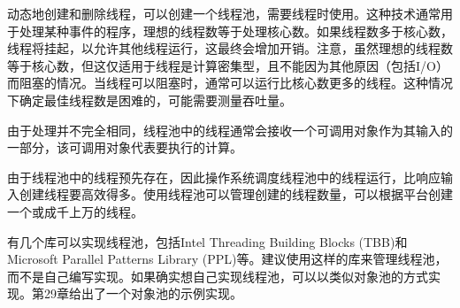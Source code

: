 动态地创建和删除线程，可以创建一个线程池，需要线程时使用。这种技术通常用于处理某种事件的程序，理想的线程数等于处理核心数。如果线程数多于核心数，线程将挂起，以允许其他线程运行，这最终会增加开销。注意，虽然理想的线程数等于核心数，但这仅适用于线程是计算密集型，且不能因为其他原因（包括I/O）而阻塞的情况。当线程可以阻塞时，通常可以运行比核心数更多的线程。这种情况下确定最佳线程数是困难的，可能需要测量吞吐量。

由于处理并不完全相同，线程池中的线程通常会接收一个可调用对象作为其输入的一部分，该可调用对象代表要执行的计算。

由于线程池中的线程预先存在，因此操作系统调度线程池中的线程运行，比响应输入创建线程要高效得多。使用线程池可以管理创建的线程数量，可以根据平台创建一个或成千上万的线程。

有几个库可以实现线程池，包括Intel Threading Building Blocks (TBB)和Microsoft Parallel Patterns Library (PPL)等。建议使用这样的库来管理线程池，而不是自己编写实现。如果确实想自己实现线程池，可以以类似对象池的方式实现。第29章给出了一个对象池的示例实现。























